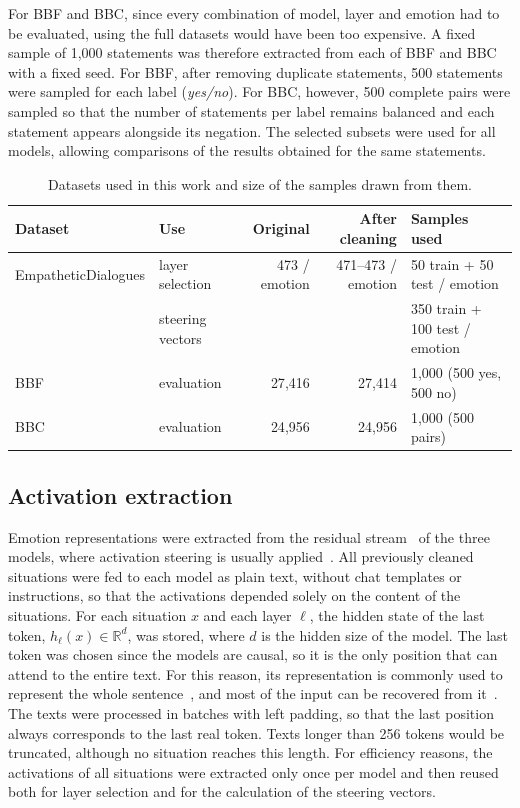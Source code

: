 \documentclass{article}
\begin{document}
For BBF and BBC, since every combination of model, layer and emotion had to be evaluated, using the full datasets would have been too expensive. A fixed sample of 1{,}000 statements was therefore extracted from each of BBF and BBC with a fixed seed. For BBF, after removing duplicate statements, 500 statements were sampled for each label (\textit{yes/no}). For BBC, however, 500 complete pairs were sampled so that the number of statements per label remains balanced and each statement appears alongside its negation. The selected subsets were used for all models, allowing comparisons of the results obtained for the same statements.

\begin{table}[h]
  \centering
  \begin{tabular}{llrrl}
    \toprule
    Dataset & Use & Original & After cleaning & Samples used \\
    \midrule
    EmpatheticDialogues & layer selection & 473 / emotion & 471--473 / emotion & 50 train + 50 test / emotion \\
                        & steering vectors &               &                    & 350 train + 100 test / emotion \\
    BBF & evaluation & 27{,}416 & 27{,}414 & 1{,}000 (500 yes, 500 no) \\
    BBC & evaluation & 24{,}956 & 24{,}956 & 1{,}000 (500 pairs) \\
    \bottomrule
  \end{tabular}
  \caption{Datasets used in this work and size of the samples drawn from them.}
  \label{tab:datasets}
\end{table}


\subsection{Activation extraction}
\label{sec:methods_extraction}
Emotion representations were extracted from the residual stream~\cite{elhage2021mathematical} of the three models, where activation steering is usually applied~\cite{turner2024steeract, panickssery2024steerllama2}. All previously cleaned situations were fed to each model as plain text, without chat templates or instructions, so that the activations depended solely on the content of the situations. For each situation $x$ and each layer $\ell$, the hidden state of the last token, $h_\ell(x) \in \mathbb{R}^d$, was stored, where $d$ is the hidden size of the model. The last token was chosen since the models are causal, so it is the only position that can attend to the entire text. For this reason, its representation is commonly used to represent the whole sentence~\cite{liu2024universal, fu2025tokenprepending}, and most of the input can be recovered from it~\cite{zhao2026rep2text}. The texts were processed in batches with left padding, so that the last position always corresponds to the last real token. Texts longer than 256 tokens would be truncated, although no situation reaches this length. For efficiency reasons, the activations of all situations were extracted only once per model and then reused both for layer selection and for the calculation of the steering vectors.
\end{document}
